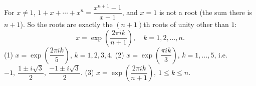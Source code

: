 For $x\ne1$, $1+x+\cdots+x^n=\dfrac{x^{n+1}-1}{x-1}$, and $x=1$ is not a root (the sum there is $n+1$). So the roots are exactly the $(n+1)$th roots of unity other than $1$:
\[x=\exp\left(\dfrac{2\pi ik}{n+1}\right),\quad k=1,2,\dots,n.\]
(1) $x=\exp\left(\dfrac{2\pi ik}5\right)$, $k=1,2,3,4$. (2) $x=\exp\left(\dfrac{\pi ik}3\right)$, $k=1,\dots,5$, i.e. $-1,\ \dfrac{1\pm i\sqrt3}2,\ \dfrac{-1\pm i\sqrt3}2$. (3) $\boxed{x=\exp\left(\dfrac{2\pi ik}{n+1}\right),\ 1\le k\le n}$.
